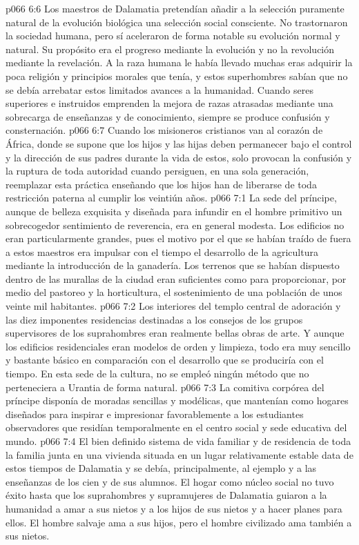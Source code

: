 \vs p066 6:6 Los maestros de Dalamatia pretendían añadir a la selección puramente natural de la evolución biológica una selección social consciente. No trastornaron la sociedad humana, pero sí aceleraron de forma notable su evolución normal y natural. Su propósito era el progreso mediante la evolución y no la revolución mediante la revelación. A la raza humana le había llevado muchas eras adquirir la poca religión y principios morales que tenía, y estos superhombres sabían que no se debía arrebatar estos limitados avances a la humanidad. Cuando seres superiores e instruidos emprenden la mejora de razas atrasadas mediante una sobrecarga de enseñanzas y de conocimiento, siempre se produce confusión y consternación.
\vs p066 6:7 Cuando los misioneros cristianos van al corazón de África, donde se supone que los hijos y las hijas deben permanecer bajo el control y la dirección de sus padres durante la vida de estos, solo provocan la confusión y la ruptura de toda autoridad cuando persiguen, en una sola generación, reemplazar esta práctica enseñando que los hijos han de liberarse de toda restricción paterna al cumplir los veintiún años.
\vs p066 7:1 La sede del príncipe, aunque de belleza exquisita y diseñada para infundir en el hombre primitivo un sobrecogedor sentimiento de reverencia, era en general modesta. Los edificios no eran particularmente grandes, pues el motivo por el que se habían traído de fuera a estos maestros era impulsar con el tiempo el desarrollo de la agricultura mediante la introducción de la ganadería. Los terrenos que se habían dispuesto dentro de las murallas de la ciudad eran suficientes como para proporcionar, por medio del pastoreo y la horticultura, el sostenimiento de una población de unos veinte mil habitantes.
\vs p066 7:2 Los interiores del templo central de adoración y las diez imponentes residencias destinadas a los consejos de los grupos supervisores de los suprahombres eran realmente bellas obras de arte. Y aunque los edificios residenciales eran modelos de orden y limpieza, todo era muy sencillo y bastante básico en comparación con el desarrollo que se produciría con el tiempo. En esta sede de la cultura, no se empleó ningún método que no perteneciera a Urantia de forma natural.
\vs p066 7:3 La comitiva corpórea del príncipe disponía de moradas sencillas y modélicas, que mantenían como hogares diseñados para inspirar e impresionar favorablemente a los estudiantes observadores que residían temporalmente en el centro social y sede educativa del mundo.
\vs p066 7:4 \pc El bien definido sistema de vida familiar y de residencia de toda la familia junta en una vivienda situada en un lugar relativamente estable data de estos tiempos de Dalamatia y se debía, principalmente, al ejemplo y a las enseñanzas de los cien y de sus alumnos. El hogar como núcleo social no tuvo éxito hasta que los suprahombres y supramujeres de Dalamatia guiaron a la humanidad a amar a sus nietos y a los hijos de sus nietos y a hacer planes para ellos. El hombre salvaje ama a sus hijos, pero el hombre civilizado ama también a sus nietos.
